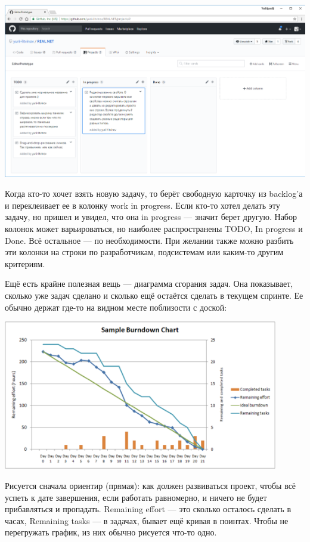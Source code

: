\documentclass{../../text-style}
\begin{document}
\begin{center}
    \includegraphics[width=\textwidth]{githubProjects.png}
\end{center}

Когда кто-то хочет взять новую задачу, то берёт свободную карточку из backlog’а и переклеивает ее в колонку work in progress. Если кто-то хотел делать эту задачу, но пришел и увидел, что она in progress --- значит берет другую. Набор колонок может варьироваться, но наиболее распространены TODO, In progress и Done. Всё остальное --- по необходимости. При желании также можно разбить эти колонки на строки по разработчикам, подсистемам или каким-то другим критериям.

Ещё есть крайне полезная вещь --- диаграмма сгорания задач. Она показывает, сколько уже задач сделано и сколько ещё остаётся сделать в текущем спринте. Ее обычно держат где-то на видном месте поблизости с доской: 

\begin{center}
    \includegraphics[width=0.9\textwidth]{burndownChart.png}
\end{center}

Рисуется сначала ориентир (прямая): как должен развиваться проект, чтобы всё успеть к дате завершения, если работать равномерно, и ничего не будет прибавляться и пропадать. Remaining effort --- это сколько осталось сделать в часах, Remaining tasks --- в задачах, бывает ещё кривая в поинтах. Чтобы не перегружать график, из них обычно рисуется что-то одно.
\end{document}
